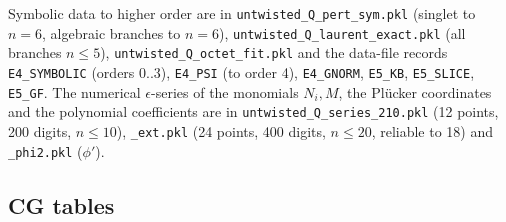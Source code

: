 \documentclass[11pt]{article}
\begin{document}
Symbolic data to higher order are in \texttt{untwisted\_\allowbreak{}Q\_\allowbreak{}pert\_\allowbreak{}sym.\allowbreak{}pkl} (singlet to $n=6$, algebraic branches to $n=6$), \texttt{untwisted\_\allowbreak{}Q\_\allowbreak{}laurent\_\allowbreak{}exact.\allowbreak{}pkl} (all branches $n\le5$), \texttt{untwisted\_\allowbreak{}Q\_\allowbreak{}octet\_\allowbreak{}fit.\allowbreak{}pkl} and the data-file records \texttt{E4\_\allowbreak{}SYMBOLIC} (orders $0..3$), \texttt{E4\_\allowbreak{}PSI} (to order 4), \texttt{E4\_\allowbreak{}GNORM}, \texttt{E5\_\allowbreak{}KB}, \texttt{E5\_\allowbreak{}SLICE}, \texttt{E5\_\allowbreak{}GF}. The numerical $\epsilon$-series of the monomials $N_i,M$, the Plücker coordinates and the polynomial coefficients are in \texttt{untwisted\_\allowbreak{}Q\_\allowbreak{}series\_\allowbreak{}210.\allowbreak{}pkl} (12 points, 200 digits, $n\le10$), \texttt{\_\allowbreak{}ext.\allowbreak{}pkl} (24 points, 400 digits, $n\le20$, reliable to 18) and \texttt{\_\allowbreak{}phi2.\allowbreak{}pkl} ($\phi'$).

\subsection{CG tables}\label{app:CG}
\end{document}
